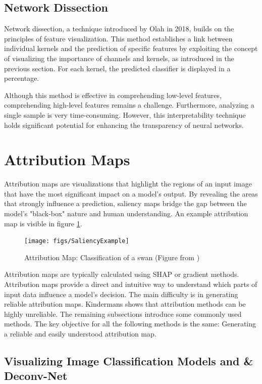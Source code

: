 \subsection{Network Dissection}

Network dissection, a technique introduced by Olah in 2018\cite{olah2018the}, builds on the principles of feature visualization. This method establishes a link between individual kernels and the prediction of specific features by exploiting the concept of visualizing the importance of channels and kernels, as introduced in the previous section. For each kernel, the predicted classifier is displayed in a percentage.

Although this method is effective in comprehending low-level features, comprehending high-level features remains a challenge. Furthermore, analyzing a single sample is very time-consuming. However, this interpretability technique holds significant potential for enhancing the transparency of neural networks.


\section{Attribution Maps}
\label{sec:saliency}
Attribution maps are visualizations that highlight the regions of an input image that have the most significant impact on a model's output. By revealing the areas that strongly influence a prediction, saliency maps bridge the gap between the model's "black-box" nature and human understanding. An example attribution map is visible in figure \ref{fig:saliency}.

\begin{figure}[H]
	\centering
	\texttt{[image: figs/SaliencyExample]}
	\caption[Attribution Map]{Attribution Map: Classification of a swan (Figure from \cite{captum})}
	\label{fig:saliency}
\end{figure}

Attribution maps are typically calculated using SHAP\cite{lundberg2017unified} or gradient methods. Attribution maps provide a direct and intuitive way to understand which parts of input data influence a model's decision. The main difficulty is in generating reliable attribution maps. Kindermans \cite{Kindermans2019} shows that attribution methods can be highly unreliable. The remaining subsections introduce some commonly used methods. The key objective for all the following methods is the same: Generating a reliable and easily understood attribution map.

\subsection{Visualizing Image Classification Models and \& Deconv-Net}

